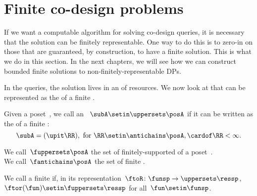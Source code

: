\section{Finite co-design problems}

If we want a computable algorithm for solving co-design queries, it is necessary that the solution can be finitely representable.
One way to do this is to zero-in on those  that are guaranteed, by construction, to have a finite solution.
This is what we do in this section.
In the next chapters, we will see how we can construct bounded finite solutions to non-finitely-representable DPs.

In the \FixFunMinRes queries, the solution lives in an  of resources.
We now look at  that can be represented as the  of a finite .

\begin{definition}
    \label{def:fuppersets}
    Given a poset~\posA, we call an ~$\subA \setin \uppersets \posA$ 
    if it can be written as the  of a finite :
    \begin{equation}
        \subA = (\upit\RR), \text{ for } \RR \setin \antichains \posA, \cardof\RR < \infty.
    \end{equation}

\end{definition}
We call~$\fuppersets \posA$ the set of finitely-supported  of a poset~\posA.
\\
We call~$\fantichains \posA$ the set of finite .

\begin{definition}
    \label{def:finite_des_prob}
    We call a  finite if, in its representation~$\ftoR \colon \funsp \to \uppersets \ressp$,
    ~$\ftor(\fun) \setin \fuppersets\ressp$ for all~$\fun\setin\funsp$.
\end{definition}

